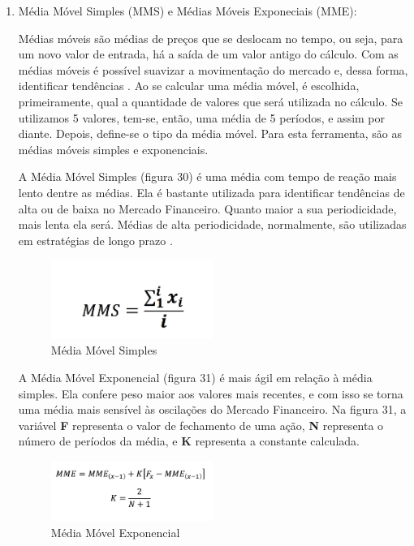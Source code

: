 \begin{description}
\begin{itemize}
\begin{enumerate}
\item Média Móvel Simples (MMS) e Médias Móveis Exponeciais (MME):\newline

Médias móveis são médias de preços que se deslocam no tempo, ou seja, para um novo valor de entrada, há a saída de um valor antigo do cálculo. Com as médias móveis é possível suavizar a movimentação do mercado e, dessa forma, identificar tendências \cite[p.68]{matsura2006}. Ao se calcular uma média móvel, é escolhida, primeiramente, qual a quantidade de valores que será utilizada no cálculo. Se utilizamos 5 valores, tem-se, então, uma média de 5 períodos, e assim por diante. Depois, define-se o tipo da média móvel. Para esta ferramenta, são as médias móveis simples e exponenciais.

A Média Móvel Simples (figura 30) é uma média com tempo de reação mais lento dentre as médias. Ela é bastante utilizada para identificar tendências de alta ou de baixa no Mercado Financeiro. Quanto maior a sua periodicidade, mais lenta ela será. Médias de alta periodicidade, normalmente, são utilizadas em estratégias de longo prazo \cite[p. 69]{matsura2006}.

\begin{figure}[h!]
\centering
\label{f25}
\includegraphics[width=0.5\textwidth]{figuras/f22}
\caption{Média Móvel Simples}
\end{figure}
\FloatBarrier

A Média Móvel Exponencial (figura 31) é mais ágil em relação à média simples. Ela confere peso maior aos valores mais recentes, e com isso se torna uma média mais sensível às oscilações do Mercado Financeiro. Na figura 31, a variável \textbf{F} representa o valor de fechamento de uma ação, \textbf{N} representa o número de períodos da média, e \textbf{K} representa a constante calculada.

\begin{figure}[h!]
\centering
\label{f26}
\includegraphics[width=0.5\textwidth]{figuras/f23}
\caption{Média Móvel Exponencial}
\end{figure}
\FloatBarrier


\end{enumerate}
\end{itemize}
\end{description}
